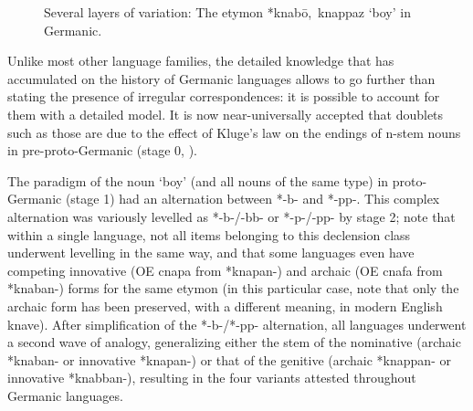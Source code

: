 \documentclass[svgnames,12pt]{scrartcl}
\newcommand{\ipa}[1]{{{\phon\mbox{#1}}}}
\begin{document}
{{   \begin{figure}[h]
   \caption{Several layers of variation: The etymon *\ipa{knabō, knappaz} `boy' in Germanic.} \label{fig:knabe}   \centering
\end{figure}

Unlike most other language families, the detailed knowledge that has accumulated on the history of Germanic languages allows to go further than stating the presence of irregular correspondences: it is possible to account for them with a detailed model. It is now near-universally accepted that doublets such as those are due to the effect of Kluge's law on the endings of n-stem nouns in pre-proto-Germanic (stage 0, \citealt{kluge1884dehnung, kroonen11nstems}). 

The paradigm of the noun `boy' (and all nouns of the same type) in proto-Germanic  (stage 1) had an alternation between *\ipa{-b-} and *\ipa{-pp-}. This complex  alternation was variously levelled as *\ipa{-b-}/\ipa{-bb-} or *\ipa{-p-}/\ipa{-pp-} by stage 2; note that within a single language, not all items belonging to this declension class underwent levelling in the same way, and that some languages even have competing innovative (OE \ipa{cnapa}  from \ipa{*knapan-}) and archaic (OE \ipa{cnafa}  from \ipa{*knaban-}) forms for the same etymon (in this particular case, note that only the archaic form has been preserved, with a different meaning, in modern English \ipa{knave}).
After simplification of the *\ipa{-b-}/*\ipa{-pp-} alternation, all languages underwent a second wave of analogy, generalizing either the stem of the nominative (archaic \ipa{*knaban-} or innovative \ipa{*knapan-}) or that of the genitive (archaic \ipa{*knappan-} or innovative \ipa{*knabban-}), resulting in the four variants attested throughout Germanic languages.

}}
\end{document}

